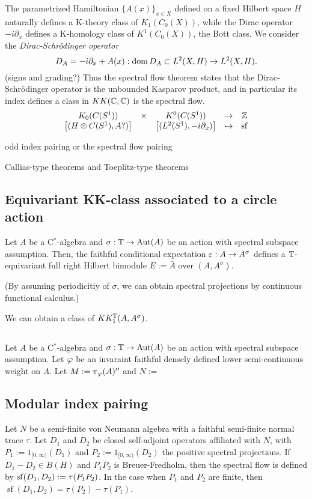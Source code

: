 \documentclass{../../large}
\renewcommand{\sf}{\operatorname{sf}}
\begin{document}
The parametrized Hamiltonian $\{A(x)\}_{x\in X}$ defined on a fixed Hilbert space $H$ naturally defines a K-theory class of $K_1(C_0(X))$, while the Dirac operator $-i\partial_x$ defines a K-homology class of $K^1(C_0(X))$, the Bott class.
We consider the \emph{Dirac-Schr\"odinger operator}
\[D_A=-i\partial_x+A(x):\operatorname{dom} D_A\subset L^2(X,H)\to L^2(X,H).\]
(signs and grading?)
Thus the spectral flow theorem states that the Dirac-Schr\"odinger operator is the unbounded Kasparov product, and in particular its index defines a class in $KK(\mathbb{C},\mathbb{C})$ is the spectral flow.
\[\begin{array}{ccccc}
K_0(C(S^1))&\times&K^0(C(S^1))&\to&\Z\\
\left[(H\otimes C(S^1),A?)\right]&&\left[(L^2(S^1),-i\partial_x)\right]&\mapsto&\sf
\end{array}\]


odd index pairing or the spectral flow pairing

Callias-type theorems and Toeplitz-type theorems



\subsection{Equivariant KK-class associated to a circle action}

Let $A$ be a C$^*$-algebra and $\sigma:\mathbb{T}\to\operatorname{Aut}(A)$ be an action with spectral subspace assumption.
Then, the faithful conditional expectation $\varepsilon:A\to A^\sigma$ defines a $\mathbb{T}$-equivariant full right Hilbert bimodule $E:=\bar A$ over $(A,A^\sigma)$.


(By assuming periodicitiy of $\sigma$, we can obtain spectral projections by continuous functional calculus.)

We can obtain a class of $KK^{\mathbb{T}}_1(A,A^\sigma)$.

\subsection{}

Let $A$ be a C$^*$-algebra and $\sigma:\mathbb{T}\to\operatorname{Aut}(A)$ be an action with spectral subspace assumption.
Let $\varphi$ be an invaraint faithful densely defined lower semi-continuous weight on $A$.
Let $M:=\pi_\varphi(A)''$ and $N:=$


\subsection{Modular index pairing}
Let $N$ be a semi-finite von Neumann algebra with a faithful semi-finite normal trace $\tau$.
Let $D_1$ and $D_2$ be closed self-adjoint operators affiliated with $N$, with $P_1:=1_{[0,\infty)}(D_1)$ and $P_2:=1_{[0,\infty)}(D_2)$ the positive spectral projections.
If $D_1-D_2\in B(H)$ and $P_1P_2$ is Breuer-Fredholm, then the spectral flow is defined by $\sf(D_1,D_2):=\index_\tau(P_1P_2)$.
In the case when $P_1$ and $P_2$ are finite, then $\sf(D_1,D_2)=\tau(P_2)-\tau(P_1)$.
\end{document}
